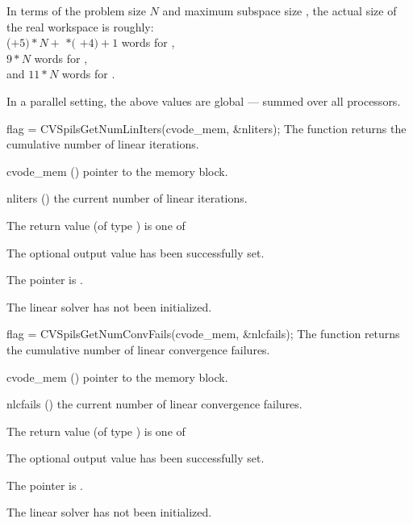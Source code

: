 {
  In terms of the problem size $N$ and maximum subspace size , 
  the actual size of the real workspace is roughly:\\
  ($+ 5)*N +$  $*($ $ + 4) + 1$ 
  words for {\cvspgmr},\\
  $9*N$  words for {\cvspbcg},\\
  and $11*N$  words for {\idasptfqmr}.

  In a parallel setting, the above values are global --- summed over all processors.
}
{
  flag = CVSpilsGetNumLinIters(cvode\_mem, \&nliters);
}
{
  The function  returns the
  cumulative number of linear iterations.
}
{
  \begin{args}
  \item[cvode\_mem] ()
    pointer to the {\cvode} memory block.
  \item[nliters] ()
    the current number of linear iterations.
  \end{args}
}
{
  The return value  (of type ) is one of
  \begin{args}
  \item[\Id{CVSPILS\_SUCCESS}] 
    The optional output value has been successfully set.
  \item[\Id{CVSPILS\_MEM\_NULL}]
    The  pointer is .
  \item[\Id{CVSPILS\_LMEM\_NULL}]
    The {\cvspils} linear solver has not been initialized.
  \end{args}
}
{}
{
  flag = CVSpilsGetNumConvFails(cvode\_mem, \&nlcfails);
}
{
  The function  returns the
  cumulative number of linear convergence failures.
}
{
  \begin{args}
  \item[cvode\_mem] ()
    pointer to the {\cvode} memory block.
  \item[nlcfails] ()
    the current number of linear convergence failures.
  \end{args}
}
{
  The return value  (of type ) is one of
  \begin{args}
  \item[\Id{CVSPILS\_SUCCESS}] 
    The optional output value has been successfully set.
  \item[\Id{CVSPILS\_MEM\_NULL}]
    The  pointer is .
  \item[\Id{CVSPILS\_LMEM\_NULL}]
    The {\cvspils} linear solver has not been initialized.
  \end{args}
}

